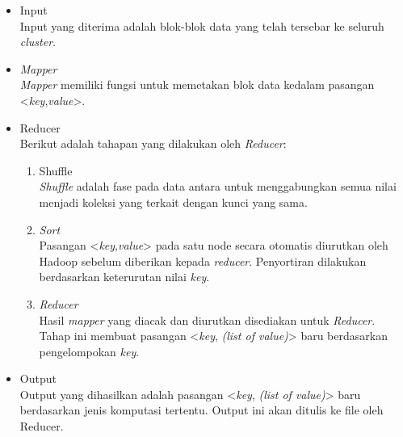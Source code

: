 \begin{itemize}
\item Input\\
Input yang diterima adalah blok-blok data yang telah tersebar ke seluruh \textit{cluster}.

\item \textit{Mapper}\\
\textit{Mapper} memiliki fungsi untuk memetakan blok data kedalam pasangan <\textit{key},\textit{value}>. 

\item Reducer\\
Berikut adalah tahapan yang dilakukan oleh \textit{Reducer}:

\begin{enumerate}

\item Shuffle \\
\textit{Shuffle} adalah fase pada data antara untuk menggabungkan semua nilai menjadi koleksi yang terkait dengan kunci yang sama.


\item \textit{Sort} \\
Pasangan <\textit{key},\textit{value}> pada satu node secara otomatis diurutkan oleh Hadoop sebelum diberikan kepada \textit{reducer}. Penyortiran dilakukan berdasarkan keterurutan nilai \textit{key}. 


\item \textit{Reducer} \\
Hasil \textit{mapper} yang diacak dan diurutkan disediakan untuk \textit{Reducer}. Tahap ini membuat pasangan <\textit{key}, \textit{(list of value)}> baru berdasarkan pengelompokan \textit{key}.
\end{enumerate}

\item Output\\
Output yang dihasilkan adalah pasangan <\textit{key}, \textit{(list of value)}> baru berdasarkan jenis komputasi tertentu. Output ini akan ditulis ke file oleh Reducer.
\end{itemize}

